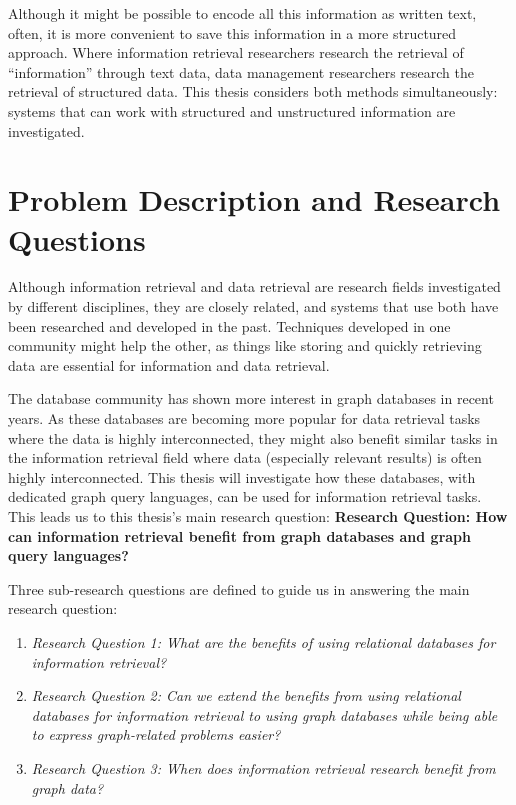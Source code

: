 Although it might be possible to encode all this information as written text, often, it is more convenient to save this information in a more structured approach. Where information retrieval researchers research the retrieval of ``information'' through text data, data management researchers research the retrieval of structured data. This thesis considers both methods simultaneously: systems that can work with structured and unstructured information are investigated.

\section{Problem Description and Research Questions}
Although information retrieval and data retrieval are research fields investigated by different disciplines, they are closely related, and systems that use both have been researched and developed in the past. Techniques developed in one community might help the other, as things like storing and quickly retrieving data are essential for information and data retrieval. 

The database community has shown more interest in graph databases in recent years. As these databases are becoming more popular for data retrieval tasks where the data is highly interconnected, they might also benefit similar tasks in the information retrieval field where data (especially relevant results) is often highly interconnected. This thesis will investigate how these databases, with dedicated graph query languages, can be used for information retrieval tasks. This leads us to this thesis's main research question: \textbf{Research Question: How can information retrieval benefit from graph databases and graph query languages?}

Three sub-research questions are defined to guide us in answering the main research question:

\begin{enumerate}
	\item \emph{Research Question 1: What are the benefits of using relational databases for information retrieval?} 
	\item \emph{Research Question 2: Can we extend the benefits from using relational databases for information retrieval to using graph databases while being able to express graph-related problems easier?} 
	\item \emph{Research Question 3: When does information retrieval research benefit from graph data?} 
\end{enumerate}

